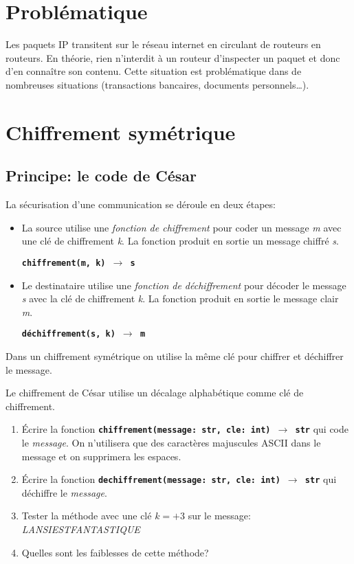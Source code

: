 \documentclass[a4paper,11pt]{article}
\begin{document}
\section{Problématique}
Les paquets IP transitent sur le réseau internet en circulant de routeurs en routeurs. En théorie, rien n'interdit à un routeur d'inspecter un paquet et donc d'en connaître son contenu. Cette situation est problématique dans de nombreuses situations (transactions bancaires, documents personnels\dots).
\begin{center}
\end{center}
\section{Chiffrement symétrique}
\subsection{Principe: le code de César}
La sécurisation d'une communication se déroule en deux étapes:
\begin{itemize}
    \item La source utilise une \emph{fonction de chiffrement} pour coder un message \emph{m} avec une clé de chiffrement \emph{k}. La fonction produit en sortie un message chiffré \emph{s}.
    \begin{center}
        \textbf{\texttt{chiffrement(m, k) $\rightarrow$ s}}
    \end{center}
    \item Le destinataire utilise une \emph{fonction de déchiffrement} pour décoder le message \emph{s} avec la clé de chiffrement \emph{k}. La fonction produit en sortie le message clair \emph{m}.
    \begin{center}
        \textbf{\texttt{déchiffrement(s, k) $\rightarrow$ m}}
    \end{center}
\end{itemize}
\begin{aretenir}[]
Dans un chiffrement symétrique on utilise la même clé pour chiffrer et déchiffrer le message.
\end{aretenir}
\begin{activite}
Le chiffrement de César utilise un décalage alphabétique comme clé de chiffrement.
\begin{enumerate}
    \item Écrire la fonction \textbf{\texttt{chiffrement(message: str, cle: int) $\rightarrow$ str}} qui code le \emph{message}. On n'utilisera que des caractères majuscules ASCII dans le message et on supprimera les espaces.
    \item Écrire la fonction \textbf{\texttt{dechiffrement(message: str, cle: int) $\rightarrow$ str}} qui déchiffre le \emph{message}.
    \item Tester la méthode avec une clé $k=+3$ sur le message: \emph{LANSIESTFANTASTIQUE}
    \item Quelles sont les faiblesses de cette méthode?
\end{enumerate}
\end{activite}
\end{document}
